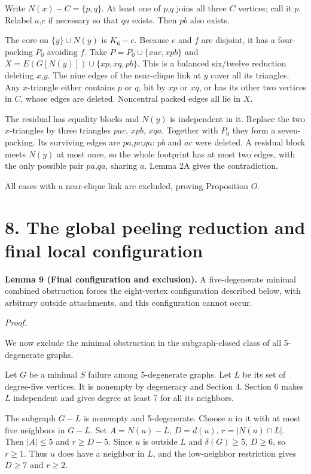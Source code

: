 \documentclass[11pt]{article}
\begin{document}
Write \(N(x)-C=\{p,q\}\). At least one of \(p\),\(q\) joins all three
\(C\) vertices; call it \(p\). Relabel \(a\),\(c\) if necessary so that
\(qa\) exists. Then \(pb\) also exists.

The core on \(\{y\}\cup N(y)\) is \(K_6-e\). Because \(e\) and \(f\) are
disjoint, it has a four-packing \(P_0\) avoiding \(f\). Take
\(P=P_0\cup \{xac,xpb\}\) and \(X=E(G[N(y)])\cup \{xp,xq,pb\}\). This is
a balanced six/twelve reduction deleting \(x\),\(y\). The nine edges of
the near-clique link at \(y\) cover all its triangles. Any
\(x\)-triangle either contains \(p\) or \(q\), hit by \(xp\) or \(xq\),
or has its other two vertices in \(C\), whose edges are deleted.
Noncentral packed edges all lie in \(X\).

The residual has equality blocks and \(N(y)\) is independent in it.
Replace the two \(x\)-triangles by three triangles \(pac\), \(xpb\),
\(xqa\). Together with \(P_0\) they form a seven-packing. Its surviving
edges are \(pa\),\(pc\),\(qa\): \(pb\) and \(ac\) were deleted. A
residual block meets \(N(y)\) at most once, so the whole footprint has
at most two edges, with the only possible pair \(pa\),\(qa\), sharing
\(a\). Lemma 2A gives the contradiction.

All cases with a near-clique link are excluded, proving Proposition
\(O\).

\section{8. The global peeling reduction and final local
configuration}\label{the-global-peeling-reduction-and-final-local-configuration}

\textbf{Lemma 9 (Final configuration and exclusion).} A five-degenerate
minimal combined obstruction forces the eight-vertex configuration
described below, with arbitrary outside attachments, and this
configuration cannot occur.

\emph{Proof.}

We now exclude the minimal obstruction in the subgraph-closed class of
all 5-degenerate graphs.

Let \(G\) be a minimal \(S\) failure among 5-degenerate graphs. Let
\(L\) be its set of degree-five vertices. It is nonempty by degeneracy
and Section 4. Section 6 makes \(L\) independent and gives degree at
least 7 for all its neighbors.

The subgraph \(G-L\) is nonempty and 5-degenerate. Choose \(u\) in it
with at most five neighbors in \(G-L\). Set \(A=N(u)-L\), \(D=d(u)\),
\(r=|N(u)\cap L|\). Then \(|A|\le 5\) and \(r\ge D-5\). Since \(u\) is
outside \(L\) and \(\delta(G)\ge 5\), \(D\ge 6\), so \(r\ge 1\). Thus
\(u\) does have a neighbor in \(L\), and the low-neighbor restriction
gives \(D\ge 7\) and \(r\ge 2\).
\end{document}

